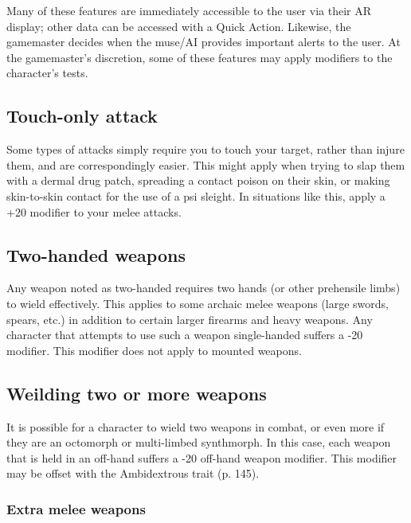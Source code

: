 Many of these features are immediately accessible to the user via their AR display; other data can be accessed with a Quick Action. Likewise, the gamemaster decides when the muse/AI provides important alerts to the user. At the gamemaster’s discretion, some of these features may apply modifiers to the character’s tests. 



\subsection{Touch-only attack} \label{sec:touch-only-attack} Some types of attacks simply require you to touch your target, rather than injure them, and are correspondingly easier. This might apply when trying to slap them with a dermal drug patch, spreading a contact poison on their skin, or making skin-to-skin contact for the use of a psi sleight. In situations like this, apply a +20 modifier to your melee attacks. 



\subsection{Two-handed weapons} \label{sec:two-handed-weapons} 

Any weapon noted as two-handed requires two hands (or other prehensile limbs) to wield effectively. This applies to some archaic melee weapons (large swords, spears, etc.) in addition to certain larger firearms and heavy weapons. Any character that attempts to use such a weapon single-handed suffers a -20 modifier. This modifier does not apply to mounted weapons. 



\subsection{Weilding two or more weapons} \label{sec:weilding-two-or-more} 

It is possible for a character to wield two weapons in combat, or even more if they are an octomorph or multi-limbed synthmorph. In this case, each weapon that is held in an off-hand suffers a -20 off-hand weapon modifier. This modifier may be offset with the Ambidextrous trait (p. 145). 

\subsubsection{Extra melee weapons} 

